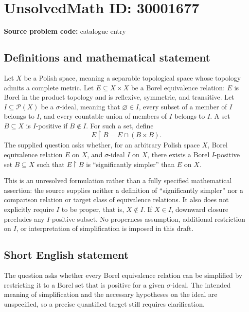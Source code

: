\documentclass[11pt]{article}
\begin{document}
\section*{UnsolvedMath ID: 30001677}
\textbf{Source problem code:} catalogue entry
\subsection{Definitions and mathematical statement}
Let \(X\) be a Polish space, meaning a separable topological space whose topology admits a complete metric. Let \(E\subseteq X\times X\) be a Borel equivalence relation: \(E\) is Borel in the product topology and is reflexive, symmetric, and transitive. Let \(I\subseteq\mathcal P(X)\) be a \(\sigma\)-ideal, meaning that \(\varnothing\in I\), every subset of a member of \(I\) belongs to \(I\), and every countable union of members of \(I\) belongs to \(I\). A set \(B\subseteq X\) is \(I\)-positive if \(B\notin I\). For such a set, define
\[
E\upharpoonright B=E\cap(B\times B).
\]
The supplied question asks whether, for an arbitrary Polish space \(X\), Borel equivalence relation \(E\) on \(X\), and \(\sigma\)-ideal \(I\) on \(X\), there exists a Borel \(I\)-positive set \(B\subseteq X\) such that \(E\upharpoonright B\) is ``significantly simpler'' than \(E\) on \(X\).

This is an unresolved formulation rather than a fully specified mathematical assertion: the source supplies neither a definition of ``significantly simpler'' nor a comparison relation or target class of equivalence relations. It also does not explicitly require \(I\) to be proper, that is, \(X\notin I\). If \(X\in I\), downward closure precludes any \(I\)-positive subset. No properness assumption, additional restriction on \(I\), or interpretation of simplification is imposed in this draft.
\subsection{Short English statement}
The question asks whether every Borel equivalence relation can be simplified by restricting it to a Borel set that is positive for a given \(\sigma\)-ideal. The intended meaning of simplification and the necessary hypotheses on the ideal are unspecified, so a precise quantified target still requires clarification.
\end{document}
